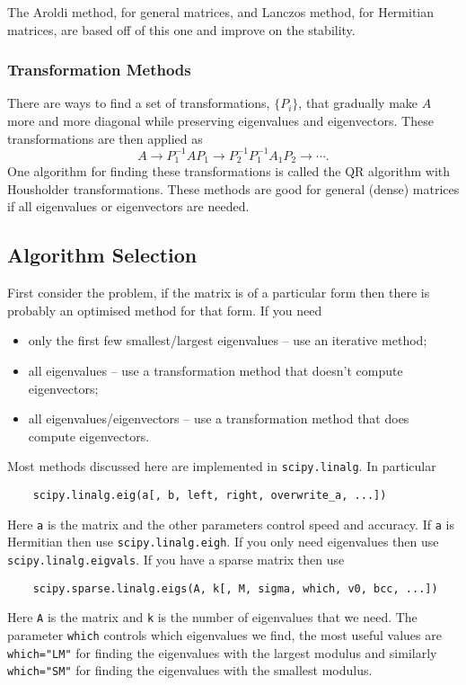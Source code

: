 \documentclass[a4paper]{article}
\begin{document}
    The Aroldi method, for general matrices, and Lanczos method, for Hermitian matrices, are based off of this one and improve on the stability.
    
    \subsubsection{Transformation Methods}
    There are ways to find a set of transformations, \(\{P_i\}\), that gradually make \(A\) more and more diagonal while preserving eigenvalues and eigenvectors.
    These transformations are then applied as
    \[A\rightarrow P_1^{-1}AP_1 \rightarrow P_2^{-1}P_1^{-1}A{_1P_2}\rightarrow\dotsb.\]
    One algorithm for finding these transformations is called the QR algorithm with Housholder transformations.
    These methods are good for general (dense) matrices if all eigenvalues or eigenvectors are needed.
    
    \subsection{Algorithm Selection}
    First consider the problem, if the matrix is of a particular form then there is probably an optimised method for that form.
    If you need
    \begin{itemize}
        \item only the first few smallest/largest eigenvalues -- use an iterative method;
        \item all eigenvalues -- use a transformation method that doesn't compute eigenvectors;
        \item all eigenvalues/eigenvectors -- use a transformation method that does compute eigenvectors.
    \end{itemize}
    Most methods discussed here are implemented in \lstinline|scipy.linalg|.
    In particular
    \begin{lstlisting}
    scipy.linalg.eig(a[, b, left, right, overwrite_a, ...])
    \end{lstlisting}
    Here \lstinline|a| is the matrix and the other parameters control speed and accuracy.
    If \lstinline|a| is Hermitian then use \lstinline|scipy.linalg.eigh|.
    If you only need eigenvalues then use \lstinline|scipy.linalg.eigvals|.
    If you have a sparse matrix then use
    \begin{lstlisting}
    scipy.sparse.linalg.eigs(A, k[, M, sigma, which, v0, bcc, ...])
    \end{lstlisting}
    Here \lstinline|A| is the matrix and \lstinline|k| is the number of eigenvalues that we need.
    The parameter \lstinline|which| controls which eigenvalues we find, the most useful values are \lstinline|which="LM"| for finding the eigenvalues with the largest modulus and similarly \lstinline|which="SM"| for finding the eigenvalues with the smallest modulus.
    
\end{document}
